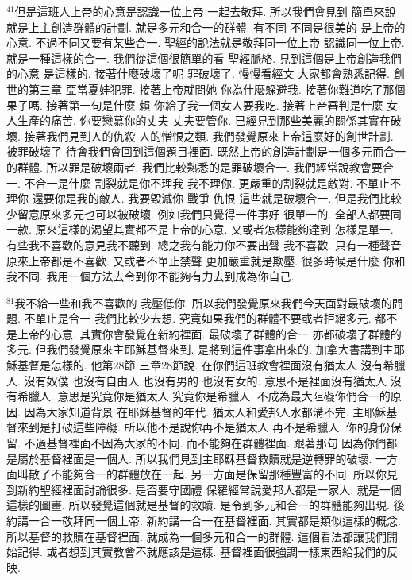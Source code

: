 \documentclass{book}
\begin{document}
$^{41}$但是這班人上帝的心意是認識一位上帝 一起去敬拜.
所以我們會見到 簡單來說就是上主創造群體的計劃.
就是多元和合一的群體.
有不同 不同是很美的 是上帝的心意.
不過不同又要有某些合一.
聖經的說法就是敬拜同一位上帝 認識同一位上帝.
就是一種這樣的合一.
我們從這個很簡單的看 聖經脈絡.
見到這個是上帝創造我們的心意 是這樣的.
接著什麼破壞了呢 罪破壞了.
慢慢看經文 大家都會熟悉記得.
創世的第三章 亞當夏娃犯罪.
接著上帝就問她 你為什麼躲避我.
接著你難道吃了那個果子嗎.
接著第一句是什麼 賴 你給了我一個女人要我吃.
接著上帝審判是什麼 女人生產的痛苦.
你要戀慕你的丈夫 丈夫要管你.
已經見到那些美麗的關係其實在破壞.
接著我們見到人的仇殺 人的憎恨之類.
我們發覺原來上帝這麼好的創世計劃.
被罪破壞了 待會我們會回到這個題目裡面.
既然上帝的創造計劃是一個多元而合一的群體.
所以罪是破壞兩者.
我們比較熟悉的是罪破壞合一.
我們經常說教會要合一.
不合一是什麼 割裂就是你不理我 我不理你.
更嚴重的割裂就是敵對.
不單止不理你 還要你是我的敵人.
我要毀滅你 戰爭 仇恨 這些就是破壞合一.
但是我們比較少留意原來多元也可以被破壞.
例如我們只覺得一件事好 很單一的.
全部人都要同一款.
原來這樣的渴望其實都不是上帝的心意.
又或者怎樣能夠達到 怎樣是單一.
有些我不喜歡的意見我不聽到.
總之我有能力你不要出聲 我不喜歡.
只有一種聲音 原來上帝都是不喜歡.
又或者不單止禁聲 更加嚴重就是欺壓.
很多時候是什麼 你和我不同.
我用一個方法去令到你不能夠有力去到成為你自己.

$^{81}$我不給一些和我不喜歡的 我壓低你.
所以我們發覺原來我們今天面對最破壞的問題.
不單止是合一 我們比較少去想.
究竟如果我們的群體不要或者拒絕多元.
都不是上帝的心意.
其實你會發覺在新約裡面.
最破壞了群體的合一 亦都破壞了群體的多元.
但我們發覺原來主耶穌基督來到.
是將到這件事拿出來的.
加拿大書講到主耶穌基督是怎樣的.
他第28節 三章28節說.
在你們這班教會裡面沒有猶太人 沒有希臘人.
沒有奴僕 也沒有自由人 也沒有男的 也沒有女的.
意思不是裡面沒有猶太人 沒有希臘人.
意思是究竟你是猶太人 究竟你是希臘人.
不成為最大阻礙你們合一的原因.
因為大家知道背景 在耶穌基督的年代.
猶太人和愛邦人水都溝不完.
主耶穌基督來到是打破這些障礙.
所以他不是說你再不是猶太人 再不是希臘人.
你的身份保留.
不過基督裡面不因為大家的不同.
而不能夠在群體裡面.
跟著那句 因為你們都是屬於基督裡面是一個人.
所以我們見到主耶穌基督救贖就是逆轉罪的破壞.
一方面叫散了不能夠合一的群體放在一起.
另一方面是保留那種豐富的不同.
所以你見到新約聖經裡面討論很多.
是否要守國禮 保羅經常說愛邦人都是一家人.
就是一個這樣的圖畫.
所以發覺這個就是基督的救贖.
是令到多元和合一的群體能夠出現.
後約講一合一敬拜同一個上帝.
新約講一合一在基督裡面.
其實都是類似這樣的概念.
所以基督的救贖在基督裡面.
就成為一個多元和合一的群體.
這個看法都讓我們開始記得.
或者想到其實教會不就應該是這樣.
基督裡面很強調一樣東西給我們的反映.
\end{document}

